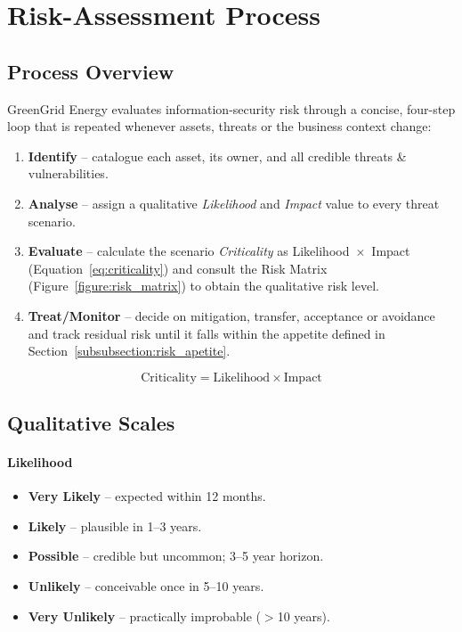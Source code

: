 \section{Risk-Assessment Process}
\label{sec:risk_assessment}

\subsection*{Process Overview}

GreenGrid Energy evaluates information-security risk through a concise,
four-step loop that is repeated whenever assets, threats or the business
context change:

\begin{enumerate}
  \item \textbf{Identify} – catalogue each asset, its owner, and all credible
        threats \& vulnerabilities.
  \item \textbf{Analyse} – assign a qualitative \emph{Likelihood} and
        \emph{Impact} value to every threat scenario.
  \item \textbf{Evaluate} – calculate the scenario \emph{Criticality} as
        Likelihood~\(\times\)~Impact (Equation~\ref{eq:criticality}) and consult
        the Risk Matrix (Figure~\ref{figure:risk_matrix}) to obtain the
        qualitative risk level.
  \item \textbf{Treat/Monitor} – decide on mitigation, transfer, acceptance or
        avoidance and track residual risk until it falls within the appetite
        defined in Section~\ref{subsubsection:risk_apetite}.
\end{enumerate}

\begin{equation}
  \text{Criticality} = \text{Likelihood} \times \text{Impact}
  \label{eq:criticality}
\end{equation}

\subsection*{Qualitative Scales}

\paragraph{Likelihood}
\begin{itemize}
  \item \textbf{Very Likely} – expected within 12 months.
  \item \textbf{Likely} – plausible in 1–3 years.
  \item \textbf{Possible} – credible but uncommon; 3–5 year horizon.
  \item \textbf{Unlikely} – conceivable once in 5–10 years.
  \item \textbf{Very Unlikely} – practically improbable (\(>\)10 years).
\end{itemize}

